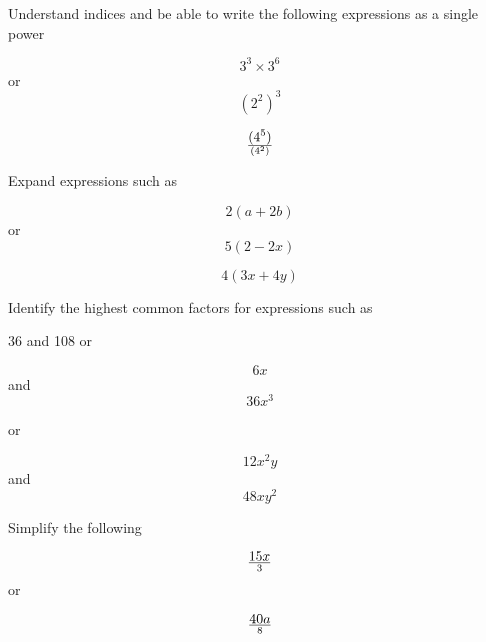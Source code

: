 \documentclass[11pt]{article}
\begin{document}
Understand indices and be able to write the following expressions as a single power
\begin{tcolorbox}[colback=green!5!white,colframe=green!75!black]
 
\begin{equation}
3^3 \times 3^6
\end{equation}
or
\begin{equation}
(2^2)^3
\end{equation}

\begin{equation}
(4^5) \over (4^2)
\end{equation}

\end{tcolorbox}


Expand expressions such as

\begin{tcolorbox}[colback=green!5!white,colframe=green!75!black]
 
\begin{equation}
2(a+2b)
\end{equation}
or
\begin{equation}
5(2-2x)
\end{equation}

\begin{equation}
4(3x+4y)
\end{equation}

\end{tcolorbox}


Identify the highest common factors for expressions such as

\begin{tcolorbox}[colback=green!5!white,colframe=green!75!black]
 
36 and 108 \newline
or \newline

$$ 6x $$  and $$ 36x^3 $$

or \newline

$$   12x^2y  $$  and $$  48xy^2 $$


\end{tcolorbox}


Simplify the following


\begin{tcolorbox}[colback=green!5!white,colframe=green!75!black]
 
$$     15x \over 3 $$ \newline
or \newline

$$ 40a \over 8 $$   \newline


\end{tcolorbox}
\end{document}
